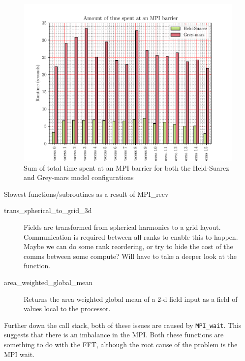 \documentclass[a4paper,11pt]{report}
\begin{document}
\begin{figure}[htbp]
\begin{center}
	\includegraphics[width=\textwidth]{img/mpi-barrier-time.pdf}
\caption[Comparison of the time spent in MPI]{Sum of total time spent at an MPI barrier for both the Held-Suarez and Grey-mars model configurations}
\label{fig:mpi-barrier}
\end{center}
\end{figure}


Slowest functions/subroutines as a result of MPI\_recv
\begin{description}
	\item[trans\_spherical\_to\_grid\_3d] Fields are transformed from spherical harmonics to a grid layout. Communication is required between all ranks to enable this to happen. Maybe we can do some rank reordering, or try to hide the cost of the comms between some compute? Will have to take a deeper look at the function.
	\item[area\_weighted\_global\_mean] Returns the area weighted global mean of a 2-d field input as a field of values local to the processor.
\end{description}

Further down the call stack, both of these issues are caused by \texttt{MPI\_wait}. This suggests that there is an imbalance in the MPI. Both these functions are something to do with the FFT, although the root cause of the problem is the MPI wait.

\clearpage
\end{document}
